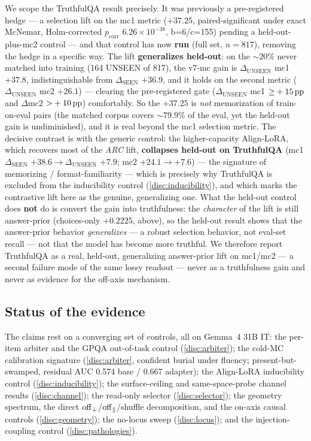 We scope the TruthfulQA result precisely. It was previously a pre-registered hedge
--- a selection lift on the mc1 metric ($+37.25$, paired-significant under exact
McNemar, Holm-corrected $p_{\mathrm{corr}}$ $6.26\times10^{-38}$, b=6/c=155)
pending a held-out-plus-mc2 control --- and that control has now \textbf{run} (full
set, $n{=}817$), removing the hedge in a specific way. The lift \textbf{generalizes
held-out}: on the ${\sim}20\%$ never matched into training (164 UNSEEN of 817),
the v7-mc gain is $\Delta_{\mathrm{UNSEEN}}$ mc1 $\mathbf{+37.8}$,
indistinguishable from $\Delta_{\mathrm{SEEN}}$ $+36.9$, and it holds on the second
metric ($\Delta_{\mathrm{UNSEEN}}$ mc2 $\mathbf{+26.1}$) --- clearing the
pre-registered gate ($\Delta_{\mathrm{UNSEEN}}$ mc1 ${\geq}+15\,\mathrm{pp}$ and $\Delta$mc2
${>}+10\,\mathrm{pp}$) comfortably. So the $+37.25$ is \emph{not} memorization of
train-on-eval pairs (the matched corpus covers ${\sim}79.9\%$ of the eval, yet the
held-out gain is undiminished), and it is real beyond the mc1 selection metric. The
decisive contrast is with the generic control: the higher-capacity Align-LoRA, which
recovers most of the \emph{ARC} lift, \textbf{collapses held-out on TruthfulQA}
(mc1 $\Delta_{\mathrm{SEEN}}$ $+38.6 \rightarrow \Delta_{\mathrm{UNSEEN}}$ $+7.9$;
mc2 $+24.1 \rightarrow +7.6$) --- the signature of memorizing / format-familiarity
--- which is precisely why TruthfulQA is excluded from the inducibility control
(\cref{disc:inducibility}), and which marks the contrastive lift here as the
genuine, generalizing one. What the held-out control does \textbf{not} do is
convert the gain into truthfulness: the \emph{character} of the lift is still
answer-prior (choices-only $+0.2225$, above), so the held-out result shows that the
answer-prior behavior \emph{generalizes} --- a robust selection behavior, not
eval-set recall --- not that the model has become more truthful. We therefore
report TruthfulQA as a real, held-out, generalizing answer-prior lift on mc1/mc2
--- a second failure mode of the same lossy readout --- never as a truthfulness
gain and never as evidence for the off-axis mechanism.

\subsection{Status of the evidence}\label{disc:status}

The claims rest on a converging set of controls, all on Gemma~4 31B IT: the
per-item arbiter and the GPQA out-of-task control (\cref{disc:arbiter}); the
cold-MC calibration signature (\cref{disc:arbiter}, confident burial under fluency;
present-but-swamped, residual AUC 0.574 base / 0.667 adapter); the Align-LoRA
inducibility control (\cref{disc:inducibility}); the surface-ceiling and
same-space-probe channel results (\cref{disc:channel}); the read-only selector
(\cref{disc:selector}); the geometry spectrum, the direct
$\mathrm{off}_{\perp}$/$\mathrm{off}_{\parallel}$/shuffle decomposition, and the on-axis causal controls
(\cref{disc:geometry}); the no-locus sweep (\cref{disc:locus}); and the
injection-coupling control (\cref{disc:pathologies}).

